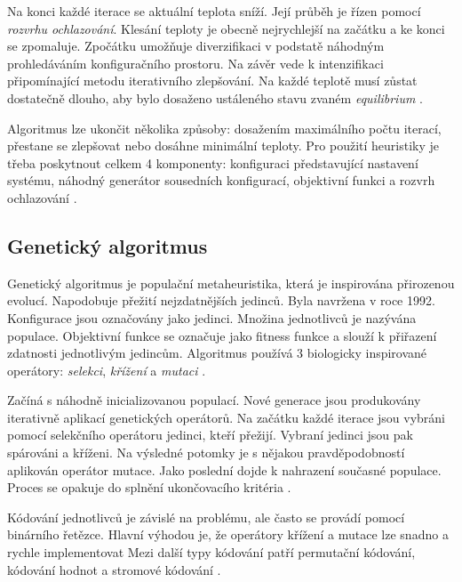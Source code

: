 Na konci každé iterace se aktuální teplota sníží.
Její průběh je řízen pomocí \textit{rozvrhu ochlazování}.
Klesání teploty je obecně nejrychlejší na začátku a ke konci se zpomaluje.
Zpočátku umožňuje diverzifikaci v podstatě náhodným prohledáváním konfiguračního prostoru.
Na závěr vede k intenzifikaci připomínající metodu iterativního zlepšování.
Na každé teplotě musí zůstat dostatečně dlouho, aby bylo dosaženo ustáleného stavu zvaném \textit{equilibrium} \cite{rutenbar, kirkpatrik}.

Algoritmus lze ukončit několika způsoby: dosažením maximálního počtu iterací, přestane se zlepšovat nebo dosáhne minimální teploty.
Pro použití heuristiky je třeba poskytnout celkem 4 komponenty: konfiguraci představující nastavení systému, náhodný generátor sousedních konfigurací, objektivní funkci a rozvrh ochlazování \cite{kirkpatrik}.


\subsection{Genetický algoritmus}
Genetický algoritmus je populační metaheuristika, která je inspirována přirozenou evolucí.
Napodobuje přežití nejzdatnějších jedinců.
Byla navržena v roce 1992.
Konfigurace jsou označovány jako jedinci.
Množina jednotlivců je nazývána populace.
Objektivní funkce se označuje jako fitness funkce a slouží k přiřazení zdatnosti jednotlivým jedincům.
Algoritmus používá 3 biologicky inspirované operátory: \textit{selekci}, \textit{křížení} a \textit{mutaci} \cite{katoch}.

Začíná s náhodně inicializovanou populací.
Nové generace jsou produkovány iterativně aplikací genetických operátorů.
Na začátku každé iterace jsou vybráni pomocí selekčního operátoru jedinci, kteří přežijí.
Vybraní jedinci jsou pak spárováni a kříženi.
Na výsledné potomky je s nějakou pravděpodobností aplikován operátor mutace.
Jako poslední dojde k nahrazení současné populace.
Proces se opakuje do splnění ukončovacího kritéria \cite{katoch}.

Kódování jednotlivců je závislé na problému, ale často se provádí pomocí binárního řetězce.
Hlavní výhodou je, že operátory křížení a mutace lze snadno a rychle implementovat 
Mezi další typy kódování patří permutační kódování, kódování hodnot a stromové kódování \cite{katoch}.

